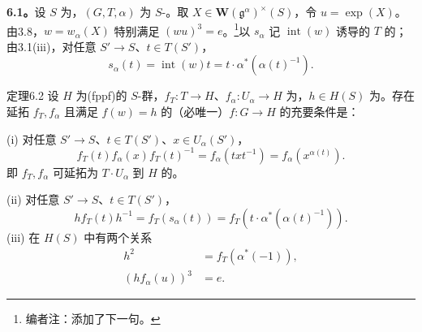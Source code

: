 \textbf{6.1。}设 $S$ 为，$(G,T,\alpha)$ 为 $S$-。取 $X\in\mathbf W(\mathfrak g^\alpha)^\times(S)$，令 $u=\exp(X)$。由3.8，$w=w_\alpha(X)$ 特别满足 $(wu)^3=e$。\footnote{编者注：添加了下一句。}以 $s_\alpha$ 记 $\operatorname{int}(w)$ 诱导的 $T$ 的；由3.1(iii)，对任意 $S'\to S$、$t\in T(S')$，
\[s_\alpha(t)=\operatorname{int}(w)t=t\cdot\alpha^*(\alpha(t)^{-1}).\]
\begin{SGAresult}{定理}{6.2}
设 $H$ 为(fppf)的 $S$-群，$f_T:T\to H$、$f_\alpha:U_\alpha\to H$ 为，$h\in H(S)$ 为。存在延拓 $f_T,f_\alpha$ 且满足 $f(w)=h$ 的（必唯一）$f:G\to H$ 的充要条件是：

(i) 对任意 $S'\to S$、$t\in T(S')$、$x\in U_\alpha(S')$，
\[f_T(t)f_\alpha(x)f_T(t)^{-1}=f_\alpha(txt^{-1})=f_\alpha(x^{\alpha(t)}).\tag{1}\]
即 $f_T,f_\alpha$ 可延拓为 $T\cdot U_\alpha$ 到 $H$ 的。

(ii) 对任意 $S'\to S$、$t\in T(S')$，
\[hf_T(t)h^{-1}=f_T(s_\alpha(t))=f_T(t\cdot\alpha^*(\alpha(t)^{-1})).\tag{2}\]
(iii) 在 $H(S)$ 中有两个关系
\begin{align}
h^2&=f_T(\alpha^*(-1)),\tag{3}\\
(hf_\alpha(u))^3&=e.\tag{4}
\end{align}
\end{SGAresult}
